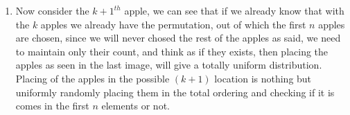 \documentclass{assignment}
\begin{document}
\begin{problemlist}
\begin{problem}
\begin{answer}
\begin{enumerate}
\begin{enumerate}
\item Now consider the $k+1^{th}$ apple, we can see that if we already know that with the $k$ apples we already have the permutation, out of which the first $n$ apples are chosen, since we will never chosed the rest of the apples as said, we need to maintain only their count, and think as if they exists, then placing the apples as seen in the last image, will give a totally uniform distribution. Placing of the apples in the possible $(k+1)$ location is nothing but uniformly randomly placing them in the total ordering and checking if it is comes in the first $n$ elements or not. 
 \end{enumerate}


\end{enumerate}


 
 \end{answer}

\end{problem}

\end{problemlist}
\end{document}
